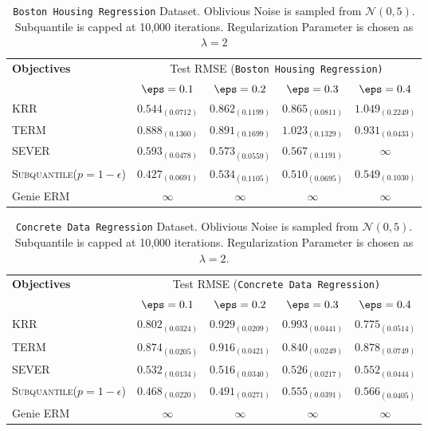 \documentclass{article} %
\theoremstyle{plain}
\theoremstyle{definition}
\theoremstyle{remark}
\newcommand{\subhead}[1]{\multicolumn{1}{c}{#1}}%
\begin{document}
\begin{table}[!h]
	\centering
	\begin{tabular}{lcccc}
		\toprule 
		\textbf{Objectives}&\multicolumn{4}{c}{Test RMSE (\texttt{Boston Housing Regression)}}\\                   
		\cmidrule(rl){2-5}
		&\subhead{$\eps = 0.1$}& \subhead{$\eps = 0.2$}& \subhead{$\eps = 0.3$}& \subhead{$\eps=0.4$}\\ 
		\midrule
		KRR  &$0.544_{(0.0712)}$&$0.862_{(0.1199)}$&$0.865_{(0.0811)}$&$1.049_{(0.2249)}$\\
		TERM \citep{li:2021} &$0.888_{(0.1360)}$&$0.891_{(0.1699)}$&$1.023_{(0.1329)}$&$0.931_{(0.0433)}$\\
		SEVER \citep{diakonikolas:2019} &$0.593_{(0.0478)}$&$0.573_{(0.0559)}$&$0.567_{(0.1191)}$&$\infty$\\
		\rowcolor{LightCyan}
		\textsc{Subquantile}($p = 1-\epsilon$) &$\mathbf{0.427_{(0.0691)}}$&$\mathbf{0.534_{(0.1105)}}$&$\mathbf{0.510_{(0.0695)}}$&$\mathbf{0.549_{(0.1030)}}$\\
		\midrule 
		Genie ERM &$\infty$&$\infty$&$\infty$&$\infty$\\
		\bottomrule
	\end{tabular}
	\caption{\texttt{Boston Housing Regression} Dataset. Oblivious Noise is sampled from $\mathcal{N}(0,5)$. Subquantile is capped at 10,000 iterations. Regularization Parameter is chosen as $\lambda = 2$}
	\label{tab:boston-housing}
\end{table}

\begin{table}[!h]
	\centering
	\begin{tabular}{lcccc}
		\toprule 
		\textbf{Objectives}&\multicolumn{4}{c}{Test RMSE (\texttt{Concrete Data Regression)}}\\                   
		\cmidrule(rl){2-5}
		&\subhead{$\eps = 0.1$}& \subhead{$\eps = 0.2$}& \subhead{$\eps = 0.3$}& \subhead{$\eps=0.4$}\\ 
		\midrule
		KRR  &$0.802_{(0.0324)}$&$0.929_{(0.0209)}$&$0.993_{(0.0441)}$&$0.775_{(0.0514)}$\\
		TERM \citep{li:2021} &$0.874_{(0.0205)}$&$0.916_{(0.0421)}$&$0.840_{(0.0249)}$&$0.878_{(0.0749)}$\\
		SEVER \citep{diakonikolas:2019} &$0.532_{(0.0134)}$&$0.516_{(0.0340)}$&$0.526_{(0.0217)}$&$0.552_{(0.0444)}$\\
		\rowcolor{LightCyan}
		\textsc{Subquantile}($p = 1-\epsilon$) &$\mathbf{0.468_{(0.0220)}}$&$\mathbf{0.491_{(0.0271)}}$&$\mathbf{0.555_{(0.0391)}}$&$\mathbf{0.566_{(0.0405)}}$\\
		\midrule 
		Genie ERM &$\infty$&$\infty$&$\infty$&$\infty$\\
		\bottomrule
	\end{tabular}
	\caption{\texttt{Concrete Data Regression} Dataset. Oblivious Noise is sampled from $\mathcal{N}(0,5)$. Subquantile is capped at 10,000 iterations. Regularization Parameter is chosen as $\lambda = 2$.}
	\label{tab:concrete-data}
\end{table}
\end{document}
